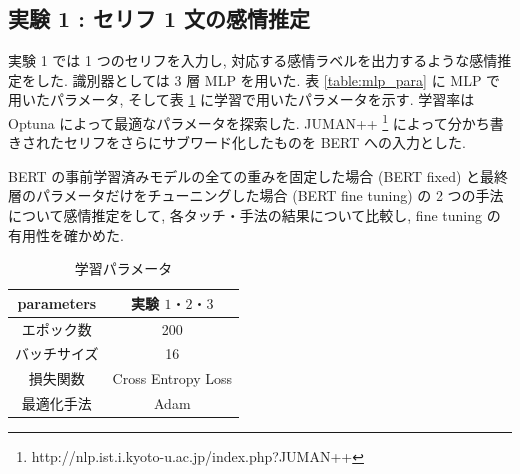 \documentclass[twocolumn]{jarticle}     %
\begin{document}
\subsection{\small{実験 1 : セリフ 1 文の感情推定}}
実験 1 では 1 つのセリフを入力し, 対応する感情ラベルを出力するような感情推定をした. 識別器としては 3 層 MLP を用いた.
表 \ref{table:mlp_para} に MLP で用いたパラメータ, そして表 \ref{table:ex_para} に学習で用いたパラメータを示す. 学習率は Optuna \cite{optuna_2019} によって最適なパラメータを探索した. JUMAN++ \footnote{http://nlp.ist.i.kyoto-u.ac.jp/index.php?JUMAN++} によって分かち書きされたセリフをさらにサブワード化したものを BERT への入力とした.

BERT の事前学習済みモデルの全ての重みを固定した場合 (BERT fixed) と最終層のパラメータだけをチューニングした場合 (BERT fine tuning) の 2 つの手法について感情推定をして, 各タッチ・手法の結果について比較し, fine tuning の有用性を確かめた.

\begin{table}[htb]
\caption{実験 1・3 MLP パラメータ}
\label{table:mlp_para}
\centering
{}
\end{table}

\begin{table}[htb]
\caption{学習パラメータ}
\label{table:ex_para}
\centering
\begin{tabular}{|c||c|c|}
\hline
parameters & \multicolumn{2}{|c|}{実験 $1・2・3$} \\ \hline
エポック数 & \multicolumn{2}{|c|}{200}  \\ \hline
バッチサイズ & \multicolumn{2}{|c|}{16} \\ \hline
損失関数 & \multicolumn{2}{|c|}{Cross Entropy Loss} \\ \hline
最適化手法 & \multicolumn{2}{|c|}{Adam} \\ \hline
\end{tabular}
\end{table}
\end{document}
